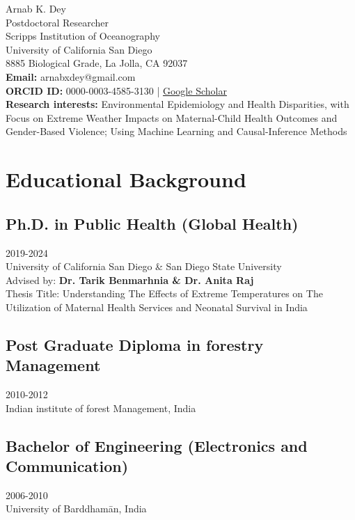 \documentclass[13pt,letterpaper]{article}
\author{Arnab Dey}
\date{\today}
\title{}
\begin{document}
\begin{center}
{\LARGE Arnab K. Dey} \\
\vspace{1.5em}
Postdoctoral Researcher\\
Scripps Institution of Oceanography\\
University of California San Diego\\
8885 Biological Grade, La Jolla, CA 92037\\
\vspace{1.5em}
\textbf{Email:} arnabxdey@gmail.com\\
\textbf{ORCID ID:} 0000-0003-4585-3130 | \href{https://scholar.google.com/citations?user=iHzQ2QUAAAAJ\&hl=en\&oi=ao}{Google Scholar} \\
\vspace{1.5em}
\textbf{Research interests:} Environmental Epidemiology and Health Disparities, with Focus on Extreme Weather Impacts on Maternal-Child Health Outcomes and Gender-Based Violence; Using Machine Learning and Causal-Inference Methods
\end{center}
\section*{Educational Background}
\label{sec:orgbe7d048}

\subsection*{Ph.D. in Public Health (Global Health)}
\label{sec:orgfde361f}
2019-2024 \\
University of California San Diego \& San Diego State University \vspace{0.5em}\\
Advised by: \textbf{Dr. Tarik Benmarhnia \& Dr. Anita Raj}  \vspace{0.5em} \\
Thesis Title: Understanding The Effects of Extreme Temperatures on The Utilization of Maternal Health Services and Neonatal Survival in India
\subsection*{Post Graduate Diploma in forestry Management}
\label{sec:org9fae15b}
2010-2012 \\
Indian institute of forest Management, India
\subsection*{Bachelor of Engineering (Electronics and Communication)}
\label{sec:org60fbb21}
2006-2010 \\
University of Barddhamān, India
\end{document}

